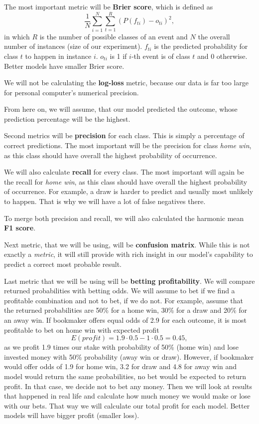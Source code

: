 \documentclass[conference]{IEEEtran}
\begin{document}
The most important metric will be \textbf{Brier score}, which is defined as 
$$\frac{1}{N} \sum_{i=1}^{N} \sum_{t=1}^{R} {(P(f_{ti}) - o_{ti})^2},$$ in which $R$ is the number of possible classes of an event and $N$ the overall number of instances (size of our experiment). $f_{ti}$ is the predicted probability for class $t$ to 
happen in instance $i$. $o_{ti}$ is 1 if $i$-th event is of class $t$ and 0 otherwise. Better models have smaller Brier score.

We will not be calculating the \textbf{log-loss} metric, because our data is far too large for personal computer's numerical 
precision.

From here on, we will assume, that our model predicted the outcome, whose prediction percentage will be the highest. 

Second metrics will be \textbf{precision} for each class. This is simply a percentage of correct predictions. The most important
will be the precision for class \textit{home win}, as this class should have overall the highest probability of occurrence.

We will also calculate \textbf{recall} for every class. The most important will again be the recall for \textit{home win}, as 
this class should have overall the highest probability of occurrence. For example, a draw is harder to predict and usually 
most unlikely to happen. That is why we will have a lot of false negatives there.

To merge both precision and recall, we will also calculated the harmonic mean \textbf{F1 score}.

Next metric, that we will be using, will be \textbf{confusion matrix}. While this is not exactly a \textit{metric}, it will 
still provide with rich insight in our model's capability to predict a correct most probable result.

Last metric that we will be using will be \textbf{betting 
profitability}. We will compare returned probabilities with betting 
odds. We will assume to bet if we find a profitable combination and 
not to bet, if we do not. For example, assume that the returned probabilities are 50\% for a home win, 30\% for a draw and 20\% for an away win. If bookmaker offers equal odds of 2.9 for each outcome, it is most profitable to bet on home win with expected profit
$$E(profit) = 1.9 \cdot 0.5 - 1 \cdot 0.5 = 0.45, $$
as we profit 1.9 times our stake with probability of 50\% (home win) and 
lose invested money with 50\% probability (away win or draw). However, if
bookmaker would offer odds of 1.9 for home win, 3.2 for draw and 4.8 for away win and model would return the same probabilities, no bet would be expected to return profit. In that case, we decide not to bet any money.
Then we will look at results that happened in real life and calculate how much money we would make or lose with our bets.
That way we will calculate our total profit for
each model. Better models will have bigger profit (smaller loss).
\end{document}
